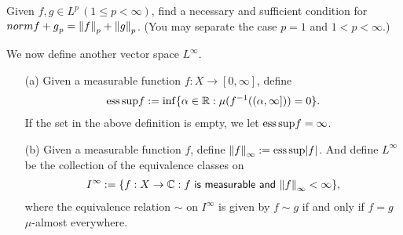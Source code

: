\ifunsolved
\else
\begin{prob}
    Given $f, g\in L^p\,(1\leq p<\infty)$, find a necessary and sufficient condition for $norm{f+g}_p={\left\lVert{f}\right\rVert}_p+{\left\lVert{g}\right\rVert}_p$.
    (You may separate the case $p=1$ and $1<p<\infty$.)
\end{prob}
\fi

We now define another vector space $L^\infty$.
\begin{defi}
    \begin{enumerate}
        \item[(a)]
        {
            Given a measurable function $f: X\rightarrow[0, \infty]$, define
            \begin{align*}
                \textrm{ess\,sup}{f}:=\inf\{\alpha\in{\mathbb{R}}: \mu(f^{-1}((\alpha, \infty]))=0\}.
            \end{align*}
            If the set in the above definition is empty, we let $\textrm{ess\,sup}{f}=\infty$.
        }
        \item[(b)]
        {
            Given a measurable function $f$, define ${\left\lVert{f}\right\rVert}_\infty:=\textrm{ess\,sup}{|f|}$.
            And define $L^\infty$ be the collection of the equivalence classes on
            \begin{align*}
                I^\infty:=\{f: X\rightarrow{\mathbb{C}} : f\textsf{ is measurable and }{\left\lVert{f}\right\rVert}_\infty<\infty\},
            \end{align*}
            where the equivalence relation $\sim$ on $I^\infty$ is given by $f\sim g$ if and only if $f=g$ $\mu$-almost everywhere.
        }
    \end{enumerate}
\end{defi}

